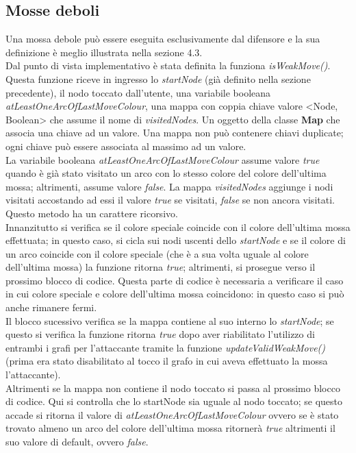 \documentclass[a4paper,11pt,twoside,openright]{report}
\begin{document}
\subsection{Mosse deboli}
Una mossa debole può essere eseguita esclusivamente dal difensore e la sua definizione è meglio illustrata nella sezione 4.3.\\
Dal punto di vista implementativo è stata definita la funziona \textit{isWeakMove()}. Questa funzione riceve in ingresso lo \textit{startNode} (già definito nella sezione precedente), il nodo toccato dall'utente, una variabile booleana \textit{atLeastOneArcOfLastMoveColour}, una mappa con coppia chiave valore <Node, Boolean> che assume il nome di \textit{visitedNodes}. Un oggetto della classe \textbf{Map}\cite{14} che associa una chiave ad un valore. Una mappa non può contenere chiavi duplicate; ogni chiave può essere associata al massimo ad un valore.\\
La variabile booleana \textit{atLeastOneArcOfLastMoveColour} assume valore \textit{true} quando è già stato visitato un arco con lo stesso colore del colore dell'ultima mossa; altrimenti, assume valore \textit{false}. La mappa \textit{visitedNodes} aggiunge i nodi visitati accostando ad essi il valore \textit{true} se visitati, \textit{false} se non ancora visitati.\\
Questo metodo ha un carattere ricorsivo.\\
Innanzitutto si verifica se il colore speciale coincide con il colore dell'ultima mossa effettuata; in questo caso, si cicla sui nodi uscenti dello \textit{startNode} e se il colore di un arco coincide con il colore speciale (che è a sua volta uguale al colore dell'ultima mossa) la funzione ritorna \textit{true}; altrimenti, si prosegue verso il prossimo blocco di codice. Questa parte di codice è necessaria a verificare il caso in cui colore speciale e colore dell'ultima mossa coincidono: in questo caso si può anche rimanere fermi.\\
Il blocco sucessivo verifica se la mappa contiene al suo interno lo \textit{startNode}; se questo si verifica la funzione ritorna \textit{true} dopo aver riabilitato l'utilizzo di entrambi i grafi per l'attaccante tramite la funzione \textit{updateValidWeakMove()} (prima era stato disabilitato al tocco il grafo in cui aveva effettuato la mossa l'attaccante).\\
Altrimenti se la mappa non contiene il nodo toccato si passa al prossimo blocco di codice. Qui si controlla che lo startNode sia uguale al nodo toccato; se questo accade si ritorna il valore di \textit{atLeastOneArcOfLastMoveColour} ovvero se è stato trovato almeno un arco del colore dell'ultima mossa ritornerà \textit{true} altrimenti il suo valore di default, ovvero \textit{false}.
\end{document}
